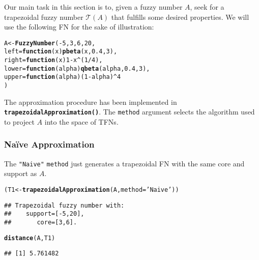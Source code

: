 \documentclass[11pt]{article}\usepackage[]{graphicx}\usepackage[]{color}
\makeatletter
\newcommand{\hlnum}[1]{\textcolor[rgb]{0.686,0.059,0.569}{#1}}%
\newcommand{\hlstr}[1]{\textcolor[rgb]{0.192,0.494,0.8}{#1}}%
\newcommand{\hlopt}[1]{\textcolor[rgb]{0,0,0}{#1}}%
\newcommand{\hlstd}[1]{\textcolor[rgb]{0.345,0.345,0.345}{#1}}%
\newcommand{\hlkwa}[1]{\textcolor[rgb]{0.161,0.373,0.58}{\textbf{#1}}}%
\newcommand{\hlkwb}[1]{\textcolor[rgb]{0.69,0.353,0.396}{#1}}%
\newcommand{\hlkwc}[1]{\textcolor[rgb]{0.333,0.667,0.333}{#1}}%
\newcommand{\hlkwd}[1]{\textcolor[rgb]{0.737,0.353,0.396}{\textbf{#1}}}%
\newenvironment{kframe}{%
 \def\at@end@of@kframe{}%
 \ifinner\ifhmode%
  \def\at@end@of@kframe{\end{minipage}}%
  \begin{minipage}{\columnwidth}%
 \fi\fi%
 \def\FrameCommand##1{\hskip\@totalleftmargin \hskip-\fboxsep
 \colorbox{shadecolor}{##1}\hskip-\fboxsep
     \hskip-\linewidth \hskip-\@totalleftmargin \hskip\columnwidth}%
 \MakeFramed {\advance\hsize-\width
   \@totalleftmargin\z@ \linewidth\hsize
   \@setminipage}}%
 {\par\unskip\endMakeFramed%
 \at@end@of@kframe}
\newenvironment{knitrout}{}{} %
\newcommand{\func}[1]{\texttt{\hlkwd{#1}}}
\newcommand{\argument}[1]{\texttt{\hlkwc{#1}}}
\newcommand{\str}[1]{\texttt{\hlstr{#1}}}
\makeatother
\begin{document}
Our main task in this section is to, given a fuzzy number $A$,
seek for a trapezoidal fuzzy number $\mathcal{T}(A)$
that fulfills some desired properties.
We will use the following FN
for the sake of illustration:

\begin{knitrout}\small
{}\color{fgcolor}\begin{kframe}
\begin{alltt}
\hlstd{A} \hlkwb{<-} \hlkwd{FuzzyNumber}\hlstd{(}\hlopt{-}\hlnum{5}\hlstd{,} \hlnum{3}\hlstd{,} \hlnum{6}\hlstd{,} \hlnum{20}\hlstd{,}
   \hlkwc{left}\hlstd{=}\hlkwa{function}\hlstd{(}\hlkwc{x}\hlstd{)} \hlkwd{pbeta}\hlstd{(x,}\hlnum{0.4}\hlstd{,}\hlnum{3}\hlstd{),}
   \hlkwc{right}\hlstd{=}\hlkwa{function}\hlstd{(}\hlkwc{x}\hlstd{)} \hlnum{1}\hlopt{-}\hlstd{x}\hlopt{^}\hlstd{(}\hlnum{1}\hlopt{/}\hlnum{4}\hlstd{),}
   \hlkwc{lower}\hlstd{=}\hlkwa{function}\hlstd{(}\hlkwc{alpha}\hlstd{)} \hlkwd{qbeta}\hlstd{(alpha,}\hlnum{0.4}\hlstd{,}\hlnum{3}\hlstd{),}
   \hlkwc{upper}\hlstd{=}\hlkwa{function}\hlstd{(}\hlkwc{alpha}\hlstd{) (}\hlnum{1}\hlopt{-}\hlstd{alpha)}\hlopt{^}\hlnum{4}
\hlstd{)}
\end{alltt}
\end{kframe}
\end{knitrout}

The approximation procedure has been implemented
in \func{trapezoidalApproximation()}.
The \argument{method} argument selects the algorithm used
to project $A$ into the space of TFNs.

\subsubsection{Na\"{i}ve Approximation}

The \str{"{}Naive"{}} \argument{method} just
generates a trapezoidal FN with the same
core and support as $A$.

\begin{knitrout}\small
{}\color{fgcolor}\begin{kframe}
\begin{alltt}
\hlstd{(T1} \hlkwb{<-} \hlkwd{trapezoidalApproximation}\hlstd{(A,} \hlkwc{method}\hlstd{=}\hlstr{'Naive'}\hlstd{))}
\end{alltt}
\begin{verbatim}
## Trapezoidal fuzzy number with:
##    support=[-5,20],
##       core=[3,6].
\end{verbatim}
\begin{alltt}
\hlkwd{distance}\hlstd{(A, T1)}
\end{alltt}
\begin{verbatim}
## [1] 5.761482
\end{verbatim}
\end{kframe}
\end{knitrout}
\end{document}
